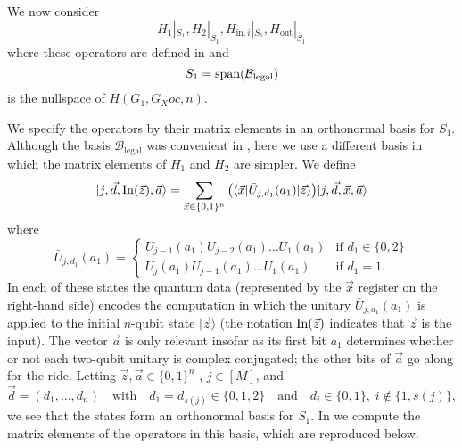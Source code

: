 \documentclass[../thesis-main/thesis-main]{subfiles}
\begin{document}
We now consider 
\begin{equation}
H_{1}|_{S_{1}},H_{2}|_{S_{1}},H_{\text{in},i}|_{S_{1}},H_{\text{out}}|_{S_{1}}\label{eq:ops_restriction_S1}
\end{equation}
where these operators are defined in  and 
\begin{equation}
S_{1}=\operatorname{span}(\mathcal{B}_{\text{legal}})
\end{equation}
is the nullspace of $H(G_1,G_Xoc,n)$.

We specify the operators  by their matrix elements in an orthonormal basis for $S_{1}$. Although the basis $\mathcal{B}_{\text{legal}}$ was convenient in , here we use a different basis in which the matrix elements of $H_{1}$ and $H_{2}$ are simpler. We define
\begin{equation}
  |j,\vec{d},\operatorname{In}(\vec{z}),\vec{a}\rangle
  =\sum_{\vec{x}\in\{0,1\}^{n}} \big(\langle\vec{x} 
   |\bar{U}_{j,d_1}(a_{1}) 
   |\vec{z}\rangle\big)|j,\vec{d},\vec{x},\vec{a}\rangle 
  \label{eq:phi_init_basis}
\end{equation}
where
\begin{equation}
  \bar{U}_{j,d_1}(a_1) = \begin{cases}
    U_{j-1}(a_1) U_{j-2}(a_1) \ldots U_1(a_1) & \text{if $d_1 \in \{0,2\}$} \\
    U_j(a_1) U_{j-1}(a_1) \ldots U_1(a_1) & \text{if $d_1=1$}.
  \end{cases}
  \label{eq:ubar}
\end{equation}
In each of these states the quantum data (represented by the $\vec{x}$ register on the right-hand side) encodes the computation in which the unitary $\bar{U}_{j,d_1}(a_1)$ is applied to the initial $n$-qubit state $|\vec{z}\rangle$ (the notation $\operatorname{In}(\vec{z})$ indicates that $\vec{z}$ is the input). The vector $\vec{a}$ is only relevant insofar as its first bit $a_{1}$ determines whether or not each two-qubit unitary is complex conjugated; the other bits of $\vec{a}$ go along for the ride. Letting $\vec{z},\vec{a}\in\{0,1\}^{n}$ , $j\in[M]$, and \begin{equation} \vec{d}=(d_{1},\ldots,d_{n})\quad\text{with}\quad d_{1}=d_{s(j)}\in\{0,1,2\}\quad\text{and}\quad d_{i}\in\{0,1\},\; i\notin\{1,s(j)\}, \end{equation} we see that the states  form an orthonormal basis for $S_{1}$. In  we compute the matrix elements of the operators  in this basis, which are reproduced below.
\end{document}
